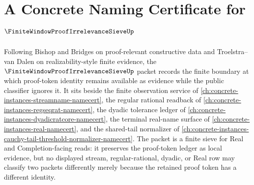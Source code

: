 \chapter{A Concrete Naming Certificate for $\FiniteWindowProofIrrelevanceSieveUp$}
\label{ch:concrete-instances-finite-window-proof-irrelevance-sieve-namecert}

Following Bishop and Bridges on proof-relevant constructive data and Troelstra--van Dalen on realizability-style finite evidence, the $\FiniteWindowProofIrrelevanceSieveUp$ packet records the finite boundary at which proof-token identity remains available as evidence while the public classifier ignores it. It sits beside the finite observation service of \autoref{ch:concrete-instances-streamname-namecert}, the regular rational readback of \autoref{ch:concrete-instances-regseqrat-namecert}, the dyadic tolerance ledger of \autoref{ch:concrete-instances-dyadicratcore-namecert}, the terminal real-name surface of \autoref{ch:concrete-instances-real-namecert}, and the shared-tail normalizer of \autoref{ch:concrete-instances-cauchy-tail-threshold-normalizer-namecert}. The packet is a finite sieve for Real and Completion-facing reads: it preserves the proof-token ledger as local evidence, but no displayed stream, regular-rational, dyadic, or Real row may classify two packets differently merely because the retained proof token has a different identity.

